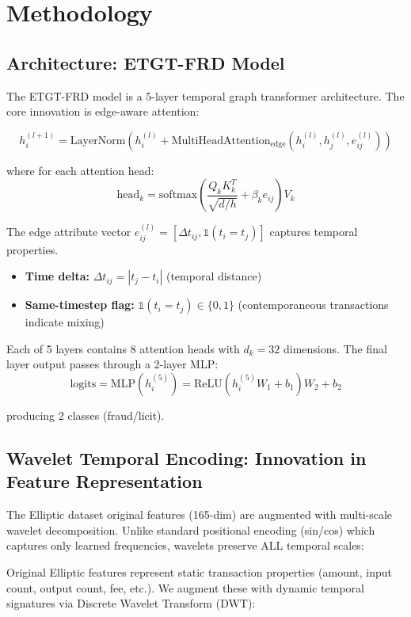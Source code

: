 \documentclass[10pt,conference,compsociety]{IEEEtran}
\begin{document}
\section{Methodology}

\subsection{Architecture: ETGT-FRD Model}

The ETGT-FRD model is a 5-layer temporal graph transformer architecture. The core innovation is edge-aware attention:

\[
h_i^{(l+1)} = \text{LayerNorm}\left(h_i^{(l)} + \text{MultiHeadAttention}_{\text{edge}}(h_i^{(l)}, h_j^{(l)}, e_{ij}^{(l)})\right)
\]

where for each attention head:
\[
\text{head}_k = \text{softmax}\left(\frac{Q_k K_k^T}{\sqrt{d/h}} + \beta_k e_{ij}\right) V_k
\]

The edge attribute vector $e_{ij}^{(l)} = [\Delta t_{ij}, \mathbb{1}(t_i = t_j)]$ captures temporal properties.
\begin{itemize}
    \item \textbf{Time delta:} $\Delta t_{ij} = |t_j - t_i|$ (temporal distance)
    \item \textbf{Same-timestep flag:} $\mathbb{1}(t_i = t_j) \in \{0, 1\}$ (contemporaneous transactions indicate mixing)
\end{itemize}

Each of 5 layers contains 8 attention heads with $d_k = 32$ dimensions. The final layer output passes through a 2-layer MLP:
\[
\text{logits} = \text{MLP}(h_i^{(5)}) = \text{ReLU}(h_i^{(5)} W_1 + b_1) W_2 + b_2
\]

producing 2 classes (fraud/licit).

\subsection{Wavelet Temporal Encoding: Innovation in Feature Representation}

The Elliptic dataset original features (165-dim) are augmented with multi-scale wavelet decomposition. Unlike standard positional encoding (sin/cos) which captures only learned frequencies, wavelets preserve ALL temporal scales:

Original Elliptic features represent static transaction properties (amount, input count, output count, fee, etc.). We augment these with dynamic temporal signatures via Discrete Wavelet Transform (DWT):
\end{document}
